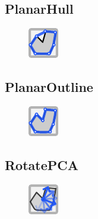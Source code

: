 \documentclass{ol-softwaremanual}
\begin{document}
\subsection{PlanarHull}
\begin{figure}[h]
    \centering
    \includegraphics[width = .5\textwidth]{figures/Icons/HULL.pdf}
\end{figure}

\subsection{PlanarOutline}
\begin{figure}[h]
    \centering
    \includegraphics[width = .5\textwidth]{figures/Icons/OUTLINE.pdf}
\end{figure}

\subsection{RotatePCA}
\begin{figure}[h]
    \centering
    \includegraphics[width = .5\textwidth]{figures/Icons/ROTATEPCA.pdf}
\end{figure}
\end{document}
